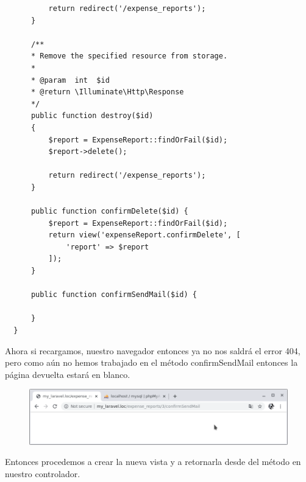 \documentclass{article}
\begin{document}
\begin{verbatim}
          return redirect('/expense_reports');
      }

      /**
      * Remove the specified resource from storage.
      *
      * @param  int  $id
      * @return \Illuminate\Http\Response
      */
      public function destroy($id)
      {
          $report = ExpenseReport::findOrFail($id);
          $report->delete();

          return redirect('/expense_reports');
      }

      public function confirmDelete($id) {
          $report = ExpenseReport::findOrFail($id);
          return view('expenseReport.confirmDelete', [
              'report' => $report
          ]);
      }

      public function confirmSendMail($id) {

      }
  }
\end{verbatim}

Ahora si recargamos, nuestro navegador entonces ya no nos saldrá el error 404,
pero como aún no hemos trabajado en el método confirmSendMail entonces la
página devuelta estará en blanco.\\

\begin{figure}[h!]
  \centering
  \includegraphics[scale=0.5]{./Pictures/121_blank_page_ok.png}
\end{figure}

Entonces procedemos a crear la nueva vista y a retornarla desde del método en
nuestro controlador.\\
\end{document}
